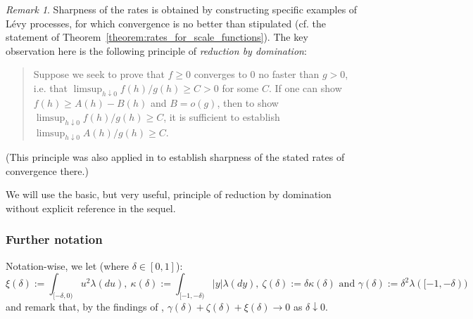\documentclass[pdftex,oneside,11pt,reqno]{amsart}
\theoremstyle{definition}
\theoremstyle{theorem}
\theoremstyle{remark}
\newtheorem{remark}{Remark}[section]
\numberwithin{equation}{section}
\numberwithin{definition}{section}
\begin{document}
\begin{remark}
Sharpness of the rates is obtained by constructing specific examples of L\'evy processes, for which convergence is no better than stipulated (cf. the statement of Theorem~\ref{theorem:rates_for_scale_functions}). The key observation here is the following principle of \emph{reduction by domination}: 
\begin{quote}
Suppose we seek to prove that $f\geq 0$ converges to $0$ no faster than $g>0$, i.e. that $\limsup_{h\downarrow 0}f(h)/g(h)\geq C>0$ for some $C$. If one can show $f(h)\geq A(h)-B(h)$ and $B=o(g)$, then to show $\limsup_{h\downarrow 0}f(h)/g(h)\geq C$, it is sufficient to establish $\limsup_{h\downarrow 0}A(h)/g(h)\geq C$. 
\end{quote}
(This principle was also applied in \cite{vidmarmijatovicsaul} to establish sharpness of the stated rates of convergence there.)
\end{remark}
We will use the basic, but very useful, principle of reduction by domination without explicit reference in the sequel. 

\subsubsection{Further notation}
Notation-wise, we let  (where $\delta\in [0,1]$):
$$\xi(\delta):=\int_{[-\delta,0)}u^2{\lambda}(du),\ \kappa(\delta):=\int_{[-1,-\delta)}\vert y\vert{\lambda}(dy),\ \zeta(\delta):=\delta\kappa(\delta)\text{ and }\gamma(\delta):=\delta^2{\lambda}([-1,-\delta))$$
and remark that, by the findings of \cite[Lemma 3.8]{vidmarmijatovicsaul}, $\gamma(\delta)+\zeta(\delta)+\xi(\delta)\to 0$ as $\delta\downarrow 0$.
\end{document}
